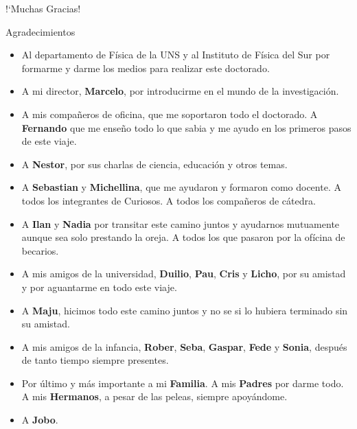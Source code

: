 \documentclass[8pt]{beamer}
\begin{document}
\begin{frame}
\centering
\Large !`Muchas Gracias!
\end{frame}

\begin{frame}[t]{Agradecimientos}
\small
\begin{itemize}
    \item<1-> Al departamento de Física de la UNS y al Instituto de Física del Sur por formarme y darme los medios para realizar este doctorado.
    \item<2-> A mi director, \textbf{Marcelo}, por introducirme en el mundo de la investigación.
    \item<3-> A mis compañeros de oficina, que me soportaron todo el doctorado. A \textbf{Fernando} que me enseño todo lo que sabia y me ayudo en los primeros pasos de este viaje.
    \item<4-> A \textbf{Nestor}, por sus charlas de ciencia, educación y otros temas.
    \item<5-> A \textbf{Sebastian} y \textbf{Michellina}, que me ayudaron y formaron como docente. A todos los integrantes de Curiosos. A todos los compañeros de cátedra.
    \item<6-> A \textbf{Ilan} y \textbf{Nadia} por transitar este camino juntos y ayudarnos mutuamente aunque sea solo prestando la oreja. A todos los que pasaron por la ofícina de becarios.
    \item<7-> A mis amigos de la universidad, \textbf{Duilio}, \textbf{Pau}, \textbf{Cris} y \textbf{Licho}, por su amistad y por aguantarme en todo este viaje.
    \item<8-> A \textbf{Maju}, hicimos todo este camino juntos y no se si lo hubiera terminado sin su amistad.
    \item<9-> A mis amigos de la infancia, \textbf{Rober}, \textbf{Seba}, \textbf{Gaspar}, \textbf{Fede} y \textbf{Sonia}, después de
tanto tiempo siempre presentes.
    \item<10-> Por último y más importante a mi \textbf{Familia}. A mis \textbf{Padres} por darme todo. A mis
\textbf{Hermanos}, a pesar de las peleas, siempre apoyándome.
    \item<11-> A \textbf{Jobo}.
\end{itemize}
\end{frame}
\end{document}
